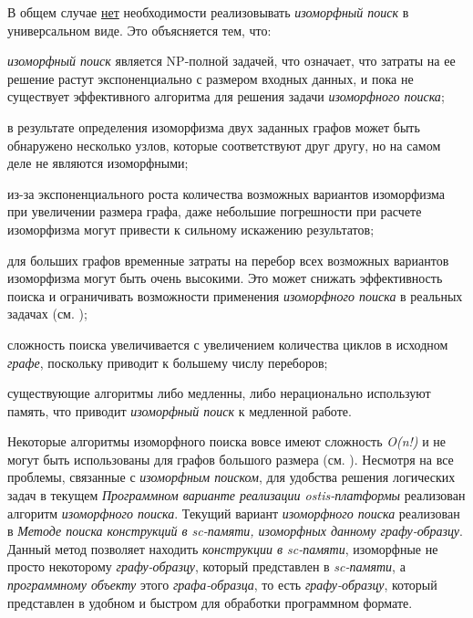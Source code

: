 \begin{SCn}
\begin{scnsubstruct}
\begin{scnsubstruct}
\begin{scnsubstruct}
\begin{scnsubstruct}
\begin{scnsubstruct}
\begin{scnsubstruct}
{	В общем случае \uline{нет} необходимости реализовывать \textit{изоморфный поиск} в универсальном виде. Это объясняется тем, что:
	\begin{scnitemize}
		\item \textit{изоморфный поиск} является NP-полной задачей, что означает, что затраты на ее решение растут экспоненциально с размером входных данных, и пока не существует эффективного алгоритма для решения задачи \textit{изоморфного поиска};
		\item в результате определения изоморфизма двух заданных графов может быть обнаружено несколько узлов, которые соответствуют друг другу, но на самом деле не являются изоморфными;
		\item из-за экспоненциального роста количества возможных вариантов изоморфизма при увеличении размера графа, даже небольшие погрешности при расчете изоморфизма могут привести к сильному искажению результатов;
		\item для больших графов временные затраты на перебор всех возможных вариантов изоморфизма могут быть очень высокими. Это может снижать эффективность поиска и ограничивать возможности применения \textit{изоморфного поиска} в реальных задачах (см. \cite{Cordella2004});
		\item сложность поиска увеличивается с увеличением количества циклов в исходном \textit{графе}, поскольку приводит к большему числу переборов;
		\item существующие алгоритмы либо медленны, либо нерационально используют память, что приводит \textit{изоморфный поиск} к медленной работе.
	\end{scnitemize}
	
	Некоторые алгоритмы изоморфного поиска вовсе имеют сложность \textit{O(n!)} и не могут быть использованы для графов большого размера (см. \cite{Fort1996}). Несмотря на все проблемы, связанные с \textit{изоморфным поиском}, для удобства решения логических задач в текущем \textit{Программном варианте реализации ostis-платформы} реализован  алгоритм \textit{изоморфного поиска}. Текущий вариант \textit{изоморфного поиска} реализован в \textit{Методе поиска конструкций в sc-памяти, изоморфных данному графу-образцу}. Данный метод позволяет находить \textit{конструкции в sc-памяти}, изоморфные не просто некоторому \textit{графу-образцу}, который представлен в \textit{sc-памяти}, а \textit{программному объекту} этого \textit{графа-образца}, то есть \textit{графу-образцу}, который представлен в удобном и быстром для обработки программном формате.}


\end{scnsubstruct}
\end{scnsubstruct}
\end{scnsubstruct}
\end{scnsubstruct}
\end{scnsubstruct}
\end{scnsubstruct}
\end{SCn}
